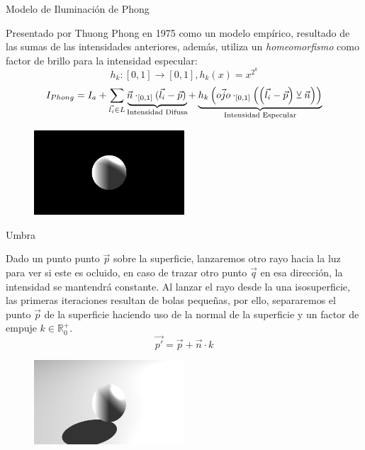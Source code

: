 \begin{frame}{Modelo de Iluminación de Phong}

    Presentado por Thuong Phong en 1975 como un modelo empírico\cite{phong1975illumination}, resultado de las sumas de las intensidades anteriores, además, utiliza un \textit{homeomorfismo} como factor de brillo para la intensidad especular:
    \[h_k:[0,1]\longrightarrow[0,1] , h_k(x)=x^{2^k}\]
    \[I_{Phong}=I_a+\sum_{\Vec{l_i}\in L} \mathrlap{\underbrace{\phantom{\Vec{n}\cdot_{[0, 1]}(\Vec{l_i}-\Vec{p})}}_{\text{Intensidad Difusa}}}\Vec{n}\cdot_{[0, 1]}(\Vec{l_i}-\Vec{p}) + \mathrlap{\underbrace{\phantom{h_k\left(\Vec{ojo}\cdot_{[0, 1]}\left(\left(\Vec{l_i}-\Vec{p}\right) \veebar \Vec{n}\right)\right)}}_{\text{Intensidad Especular}}}h_k\left(\Vec{ojo}\cdot_{[0, 1]}\left(\left(\Vec{l_i}-\Vec{p}\right) \veebar \Vec{n}\right)\right)\]
    
    \begin{figure}[H]
      \centering
      \includegraphics[width=0.5\textwidth]{imagenes/lightmodel/phong.png}
    \end{figure}
    
\end{frame}

\begin{frame}{Umbra}

    Dado un punto punto \(\Vec{p}\) sobre la superficie, lanzaremos otro rayo hacia la luz para ver si este es ocluido, en caso de trazar otro punto \(\Vec{q}\) en esa dirección, la intensidad se mantendrá constante.
    \vfill
    Al lanzar el rayo desde la una isosuperficie, las primeras iteraciones resultan de bolas pequeñas, por ello, separaremos el punto \(\Vec{p}\) de la superficie haciendo uso de la normal de la superficie y un factor de empuje \(k\in\mathbb{R}^{+}_{0}\).
    \[\Vec{p'}=\Vec{p} + \Vec{n} \cdot k\]
    \vfill
    \begin{figure}[H]
      \centering
      \includegraphics[width=0.5\textwidth]{imagenes/lightmodel/sombra_dura.png}
    \end{figure}
    
\end{frame}